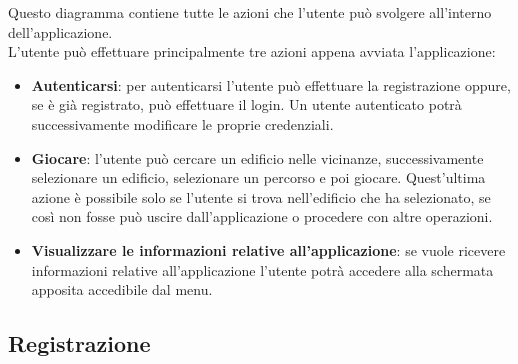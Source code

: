 Questo diagramma contiene tutte le azioni che l'utente può svolgere all'interno dell'applicazione. \\
L'utente può effettuare principalmente tre azioni appena avviata l'applicazione:
\begin{itemize}
	\item \textbf{Autenticarsi}: per autenticarsi l'utente può effettuare la registrazione oppure, se è già registrato, può effettuare il login. Un utente autenticato potrà successivamente modificare le proprie credenziali.
	\item \textbf{Giocare}: l'utente può cercare un edificio nelle vicinanze, successivamente selezionare un edificio, selezionare un percorso e poi giocare. Quest'ultima azione è possibile solo se l'utente si trova nell'edificio che ha selezionato, se così non fosse può uscire dall'applicazione o procedere con altre operazioni.
	\item \textbf{Visualizzare le informazioni relative all'applicazione}: se vuole ricevere informazioni relative all'applicazione l'utente potrà accedere alla schermata apposita accedibile dal menu.
\end{itemize}


\subsection{Registrazione}

